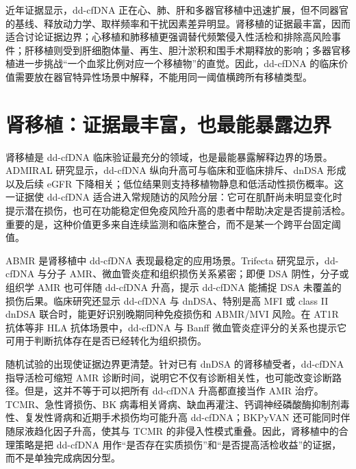 \documentclass[11pt,a4paper]{article}
\begin{document}
近年证据显示，dd-cfDNA
正在心、肺、肝和多器官移植中迅速扩展，但不同器官的基线、释放动力学、取样频率和干扰因素差异明显\cite{clinicalutilityof2024, circulatingcellfree2024, donorderivedcell2023}。肾移植的证据最丰富，因而适合讨论证据边界；心移植和肺移植更强调替代频繁侵入性活检和排除高风险事件；肝移植则受到肝细胞体量、再生、胆汁淤积和围手术期释放的影响；多器官移植进一步挑战``一个血浆比例对应一个移植物''的直觉。因此，dd-cfDNA
的临床价值需要放在器官特异性场景中解释，不能用同一阈值横跨所有移植类型。

\section{肾移植：证据最丰富，也最能暴露边界}\label{ux80beux79fbux690dux8bc1ux636eux6700ux4e30ux5bccux4e5fux6700ux80fdux66b4ux9732ux8fb9ux754c}

肾移植是 dd-cfDNA 临床验证最充分的领域，也是最能暴露解释边界的场景。ADMIRAL
研究显示，dd-cfDNA 纵向升高可与临床和亚临床排斥、dnDSA
形成以及后续 eGFR 下降相关；低位结果则支持移植物静息和低活动性损伤概率\cite{clinicaloutcomesfrom2021}。这一证据使
dd-cfDNA
适合进入常规随访的风险分层：它可在肌酐尚未明显变化时提示潜在损伤，也可在功能稳定但免疫风险升高的患者中帮助决定是否提前活检。重要的是，这种价值更多来自连续监测和临床整合，而不是某一个跨平台固定阈值。

ABMR 是肾移植中 dd-cfDNA
表现最稳定的应用场景。Trifecta 研究显示，dd-cfDNA
与分子 AMR、微血管炎症和组织损伤关系紧密；即便 DSA 阴性，分子或组织学 AMR
也可伴随 dd-cfDNA 升高，提示 dd-cfDNA
能捕捉 DSA 未覆盖的损伤后果\cite{thetrifectastudy2022, antibodymediatedrejection2022}。临床研究还显示
dd-cfDNA 与 dnDSA、特别是高 MFI 或 class II dnDSA
联合时，能更好识别晚期同种免疫损伤和 ABMR/MVI 风险\cite{donorderivedcell2022, combiningdonorderived20221, donorderivedcell20242}。在
AT1R 抗体等非 HLA 抗体场景中，dd-cfDNA
与 Banff 微血管炎症评分的关系也提示它可用于判断抗体存在是否已经转化为组织损伤\cite{utilityofdonor2021}。

随机试验的出现使证据边界更清楚。针对已有 dnDSA
的肾移植受者，dd-cfDNA
指导活检可缩短 AMR 诊断时间，说明它不仅有诊断相关性，也可能改变诊断路径\cite{donorderivedcell20241}。但是，这并不等于可以把所有
dd-cfDNA 升高都直接当作 AMR
治疗。TCMR、急性肾损伤、BK 病毒相关肾病、缺血再灌注、钙调神经磷酸酶抑制剂毒性、复发性肾病和近期手术损伤均可能升高
dd-cfDNA；BKPyVAN 还可能同时伴随尿液趋化因子升高，使其与 TCMR
的非侵入性模式重叠\cite{levelsofdonor2022, diagnosticpotentialof2022}。因此，肾移植中的合理策略是把
dd-cfDNA 用作``是否存在实质损伤''和``是否提高活检收益''的证据，而不是单独完成病因分型。
\end{document}

